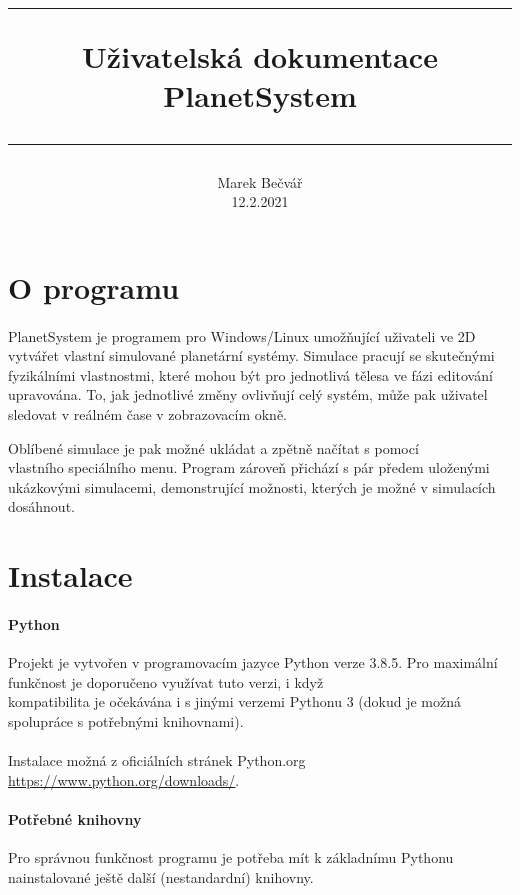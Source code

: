 \documentclass[a4paper, 12pt]{article}
\title{
        \vspace{1in}
        \rule{\linewidth}{0.5pt}
		\usefont{OT1}{bch}{b}{n}
        \huge Uživatelská dokumentace \\PlanetSystem\\
        \vspace{-10pt}
        \rule{\linewidth}{1pt}
}
\author{
		\normalfont\normalsize
        Marek Bečvář\\[-3pt]\normalsize
        12.2.2021
}
\date{}
\begin{document}
\maketitle 
\newpage

\tableofcontents
\newpage

\section{O programu} 
\paragraph{}
PlanetSystem je programem pro Windows/Linux umožňující uživateli ve 2D vytvářet
vlastní simulované planetární systémy. Simulace pracují se skutečnými
fyzikálními vlastnostmi, které mohou být pro jednotlivá tělesa ve fázi
editování upravována. To, jak jednotlivé změny ovlivňují celý systém, může pak
uživatel sledovat v reálném čase v zobrazovacím okně.

Oblíbené simulace je pak možné ukládat a zpětně načítat s pomocí \\vlastního
speciálního menu. Program zároveň přichází s pár předem uloženými ukázkovými
simulacemi, demonstrující možnosti, kterých je možné v simulacích dosáhnout. 

\section{Instalace}
\paragraph{Python}
Projekt je vytvořen v programovacím jazyce Python verze 3.8.5. Pro maximální
funkčnost je doporučeno využívat tuto verzi, i když \\kompatibilita je
očekávána i s jinými verzemi Pythonu 3 (dokud je možná spolupráce s potřebnými
knihovnami).\\\\ Instalace možná z oficiálních stránek Python.org
\url{https://www.python.org/downloads/}.

\paragraph{Potřebné knihovny} Pro správnou funkčnost programu je potřeba mít k
základnímu Pythonu nainstalované ještě další (nestandardní) knihovny. 
\end{document}
